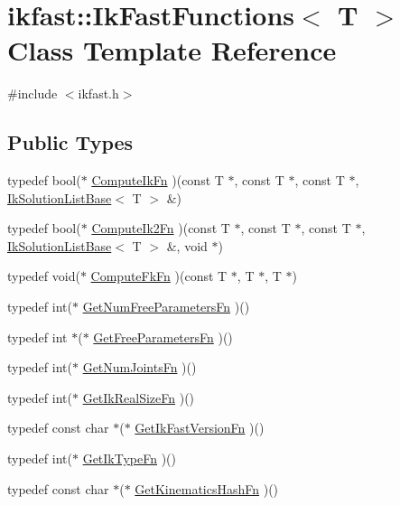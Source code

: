 \hypertarget{classikfast_1_1IkFastFunctions}{\section{ikfast\-:\-:Ik\-Fast\-Functions$<$ T $>$ Class Template Reference}
\label{classikfast_1_1IkFastFunctions}
}


{\ttfamily \#include $<$ikfast.\-h$>$}

\subsection*{Public Types}
\begin{DoxyCompactItemize}
\item 
typedef bool($\ast$ \hyperlink{classikfast_1_1IkFastFunctions_a4bf1d6c1c81b69e2990d9e4bac57ca6f}{Compute\-Ik\-Fn} )(const T $\ast$, const T $\ast$, const T $\ast$, \hyperlink{classikfast_1_1IkSolutionListBase}{Ik\-Solution\-List\-Base}$<$ T $>$ \&)
\item 
typedef bool($\ast$ \hyperlink{classikfast_1_1IkFastFunctions_ac7350210edd45a662ff961ffc4bcca0f}{Compute\-Ik2\-Fn} )(const T $\ast$, const T $\ast$, const T $\ast$, \hyperlink{classikfast_1_1IkSolutionListBase}{Ik\-Solution\-List\-Base}$<$ T $>$ \&, void $\ast$)
\item 
typedef void($\ast$ \hyperlink{classikfast_1_1IkFastFunctions_ad69044909936c82f15dc7412bba148bd}{Compute\-Fk\-Fn} )(const T $\ast$, T $\ast$, T $\ast$)
\item 
typedef int($\ast$ \hyperlink{classikfast_1_1IkFastFunctions_a0dff63763caf3748a37703a8d2a0b257}{Get\-Num\-Free\-Parameters\-Fn} )()
\item 
typedef int $\ast$($\ast$ \hyperlink{classikfast_1_1IkFastFunctions_aa86be2aa954cb58428a9266e49637f92}{Get\-Free\-Parameters\-Fn} )()
\item 
typedef int($\ast$ \hyperlink{classikfast_1_1IkFastFunctions_ac56ef17997969248944c8ed23cbd713f}{Get\-Num\-Joints\-Fn} )()
\item 
typedef int($\ast$ \hyperlink{classikfast_1_1IkFastFunctions_a8fdfa2de1f393a175d2c7629d1388b24}{Get\-Ik\-Real\-Size\-Fn} )()
\item 
typedef const char $\ast$($\ast$ \hyperlink{classikfast_1_1IkFastFunctions_aa76607a495cad0b6fff6b17b614fbcbb}{Get\-Ik\-Fast\-Version\-Fn} )()
\item 
typedef int($\ast$ \hyperlink{classikfast_1_1IkFastFunctions_afcd749bb7f6e0f5dce01cac098d6cc81}{Get\-Ik\-Type\-Fn} )()
\item 
typedef const char $\ast$($\ast$ \hyperlink{classikfast_1_1IkFastFunctions_ae7fca1cf436c1b8e43a35f275f1c48ff}{Get\-Kinematics\-Hash\-Fn} )()
\end{DoxyCompactItemize}
